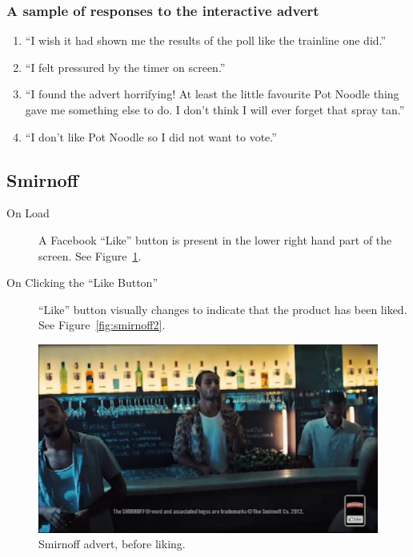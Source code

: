 \subsubsection*{A sample of responses to the interactive advert}
	\begin{enumerate}
		\item{``I wish it had shown me the results of the poll like the trainline one did.''}
		\item{``I felt pressured by the timer on screen.''}
		\item{``I found the advert horrifying! At least the little favourite Pot Noodle thing gave me something else to do. I don't think I will ever forget that spray tan.''}
		\item{``I don't like Pot Noodle so I did not want to vote.''}
	\end{enumerate}

\clearpage
\subsection{Smirnoff}
	\begin{description}
		\item[On Load]{A Facebook ``Like'' button is present in the lower right hand part of the screen. See Figure~\ref{fig:smirnoff1}.}
		\item[On Clicking the ``Like Button'']{``Like'' button visually changes to indicate that the product has been liked. See Figure~\ref{fig:smirnoff2}.}
	\end{description}

	\begin{figure}[th]
		\centering
		\includegraphics[width=\textwidth,height=0.5\textheight,keepaspectratio]{images/adverts/smirnoff-1.png}
		\caption{Smirnoff advert, before liking.}
		\label{fig:smirnoff1}
	\end{figure}


